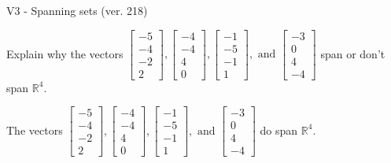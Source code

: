 \begin{exercise}
  \begin{exerciseTitle}V3 - Spanning sets (ver. 218)\end{exerciseTitle}
  \begin{exerciseStatement}
    Explain why the vectors \(\left[\begin{array}{r}
-5 \\
-4 \\
-2 \\
2
\end{array}\right] , \left[\begin{array}{r}
-4 \\
-4 \\
4 \\
0
\end{array}\right] , \left[\begin{array}{r}
-1 \\
-5 \\
-1 \\
1
\end{array}\right] , \text{ and } \left[\begin{array}{r}
-3 \\
0 \\
4 \\
-4
\end{array}\right]\) span or don't span \(\mathbb{R}^4\). 
	


  \end{exerciseStatement}
  \begin{exerciseAnswer}
   The vectors \(\left[\begin{array}{r}
-5 \\
-4 \\
-2 \\
2
\end{array}\right] , \left[\begin{array}{r}
-4 \\
-4 \\
4 \\
0
\end{array}\right] , \left[\begin{array}{r}
-1 \\
-5 \\
-1 \\
1
\end{array}\right] , \text{ and } \left[\begin{array}{r}
-3 \\
0 \\
4 \\
-4
\end{array}\right]\) 
  	 do  
	span \(\mathbb{R}^4\).
  


  \end{exerciseAnswer}
\end{exercise}